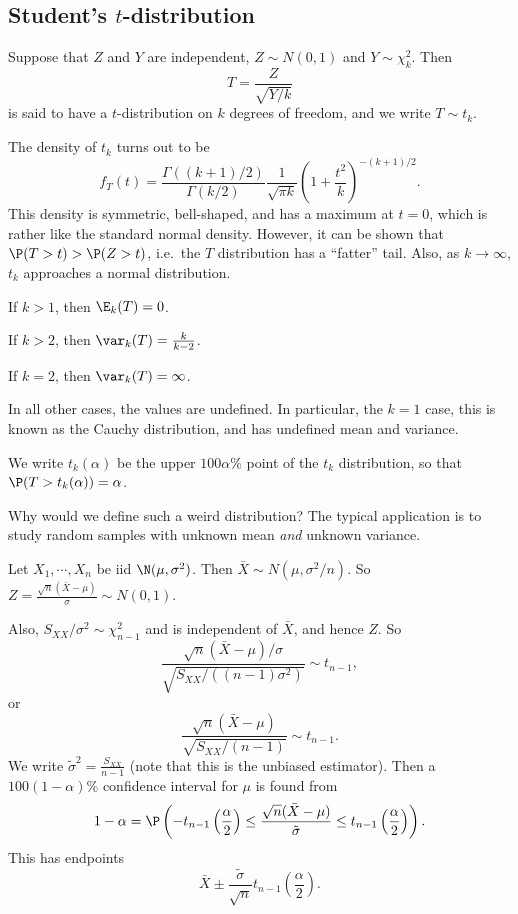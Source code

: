 \documentclass[a4paper]{article}
\begin{document}
\subsection{Student's \texorpdfstring{$t$}{t}-distribution}
\begin{defi}[$t$-distribution]
  Suppose that $Z$ and $Y$ are independent, $Z\sim N(0, 1)$ and $Y\sim \chi_k^2$. Then
  \[
    T = \frac{Z}{\sqrt{Y/k}}
  \]
  is said to have a $t$-distribution on $k$ degrees of freedom, and we write $T\sim t_k$.
\end{defi}

The density of $t_k$ turns out to be
\[
  f_T(t) = \frac{\Gamma((k + 1)/2)}{\Gamma(k/2)} \frac{1}{\sqrt{\pi k}}\left(1 + \frac{t^2}{k}\right)^{-(k+1)/2}.
\]
This density is symmetric, bell-shaped, and has a maximum at $t = 0$, which is rather like the standard normal density. However, it can be shown that $\P(T > t) > \P(Z > t)$, i.e.\ the $T$ distribution has a ``fatter'' tail. Also, as $k \to \infty$, $t_k$ approaches a normal distribution.

\begin{prop}
  If $k > 1$, then $\E_k(T) = 0$.

  If $k > 2$, then $\var_k(T) = \frac{k}{k - 2}$.

  If $k = 2$, then $\var_k(T) = \infty$.

  In all other cases, the values are undefined. In particular, the $k = 1$ case, this is known as the Cauchy distribution, and has undefined mean and variance.
\end{prop}

\begin{notation}
  We write $t_k(\alpha)$ be the upper $100\alpha\%$ point of the $t_k$ distribution, so that $\P(T > t_k(\alpha)) = \alpha$.
\end{notation}

Why would we define such a weird distribution? The typical application is to study random samples with unknown mean \emph{and} unknown variance.

Let $X_1, \cdots, X_n$ be iid $\N(\mu, \sigma^2)$. Then $\bar X \sim N(\mu, \sigma^2/n)$. So $Z = \frac{\sqrt{n}(\bar X - \mu)}{\sigma} \sim N(0, 1)$.

Also, $S_{XX}/\sigma^2 \sim \chi^2_{n - 1}$ and is independent of $\bar X$, and hence $Z$. So
\[
  \frac{\sqrt{n}(\bar X - \mu)/\sigma}{\sqrt{S_{XX}/((n - 1)\sigma^2)}} \sim t_{n - 1},
\]
or
\[
  \frac{\sqrt{n}(\bar X - \mu)}{\sqrt{S_{XX}/(n - 1)}} \sim t_{n - 1}.
\]
We write $\tilde{\sigma}^2 = \frac{S_{XX}}{n - 1}$ (note that this is the unbiased estimator). Then a $100(1 - \alpha)\%$ confidence interval for $\mu$ is found from
\[
  1 - \alpha = \P\left(-t_{n - 1}\left(\frac{\alpha}{2}\right) \leq \frac{\sqrt{n}(\bar X - \mu)}{\tilde{\sigma}} \leq t_{n - 1}\left(\frac{\alpha}{2}\right)\right).
\]
This has endpoints
\[
  \bar X \pm \frac{\tilde{\sigma}}{\sqrt{n}}t_{n - 1}\left(\frac{\alpha}{2}\right).
\]
\end{document}
